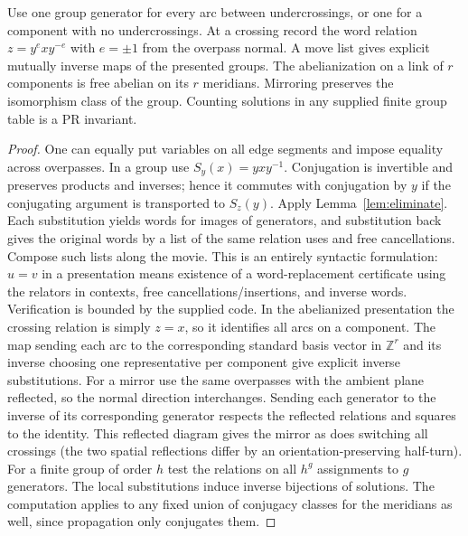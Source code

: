 \begin{theorem}
Use one group generator for every arc between undercrossings, or one for a component with no undercrossings. At a crossing record the word relation $z=y^e x y^{-e}$ with $e=\pm1$ from the overpass normal. A move list gives explicit mutually inverse maps of the presented groups. The abelianization on a link of $r$ components is free abelian on its $r$ meridians. Mirroring preserves the isomorphism class of the group. Counting solutions in any supplied finite group table is a PR invariant.
\end{theorem}
\begin{proof}
One can equally put variables on all edge segments and impose equality across overpasses. In a group use $S_y(x)=yxy^{-1}$. Conjugation is invertible and preserves products and inverses; hence it commutes with conjugation by $y$ if the conjugating argument is transported to $S_z(y)$. Apply Lemma~\ref{lem:eliminate}. Each substitution yields words for images of generators, and substitution back gives the original words by a list of the same relation uses and free cancellations. Compose such lists along the movie. This is an entirely syntactic formulation: $u=v$ in a presentation means existence of a word-replacement certificate using the relators in contexts, free cancellations/insertions, and inverse words. Verification is bounded by the supplied code. In the abelianized presentation the crossing relation is simply $z=x$, so it identifies all arcs on a component. The map sending each arc to the corresponding standard basis vector in $\mathbb Z^r$ and its inverse choosing one representative per component give explicit inverse substitutions. For a mirror use the same overpasses with the ambient plane reflected, so the normal direction interchanges. Sending each generator to the inverse of its corresponding generator respects the reflected relations and squares to the identity. This reflected diagram gives the mirror as does switching all crossings (the two spatial reflections differ by an orientation-preserving half-turn). For a finite group of order $h$ test the relations on all $h^g$ assignments to $g$ generators. The local substitutions induce inverse bijections of solutions. The computation applies to any fixed union of conjugacy classes for the meridians as well, since propagation only conjugates them.
\end{proof}

